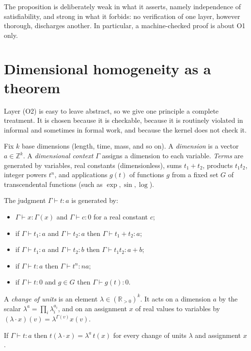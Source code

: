 The proposition is deliberately weak in what it asserts, namely independence of satisfiability, and strong in what it forbids: no verification of one layer, however thorough, discharges another. In particular, a machine-checked proof is about O1 only.

\section{Dimensional homogeneity as a theorem}
\label{sec:dimensions}

Layer (O2) is easy to leave abstract, so we give one principle a complete treatment. It is chosen because it is checkable, because it is routinely violated in informal and sometimes in formal work, and because the kernel does not check it.

Fix $k$ base dimensions (length, time, mass, and so on). A \emph{dimension} is a vector $a\in\mathbb{Z}^k$. A \emph{dimensional context} $\Gamma$ assigns a dimension to each variable. \emph{Terms} are generated by variables, real constants (dimensionless), sums $t_1+t_2$, products $t_1t_2$, integer powers $t^n$, and applications $g(t)$ of functions $g$ from a fixed set $G$ of transcendental functions (such as $\exp,\sin,\log$).

\begin{definition}
\label{def:dim-typing}
The judgment $\Gamma\vdash t:a$ is generated by:
\begin{itemize}[nosep]
\item $\Gamma\vdash x:\Gamma(x)$ and $\Gamma\vdash c:0$ for a real constant $c$;
\item if $\Gamma\vdash t_1:a$ and $\Gamma\vdash t_2:a$ then $\Gamma\vdash t_1+t_2:a$;
\item if $\Gamma\vdash t_1:a$ and $\Gamma\vdash t_2:b$ then $\Gamma\vdash t_1t_2:a+b$;
\item if $\Gamma\vdash t:a$ then $\Gamma\vdash t^n:na$;
\item if $\Gamma\vdash t:0$ and $g\in G$ then $\Gamma\vdash g(t):0$.
\end{itemize}
\end{definition}

A \emph{change of units} is an element $\lambda\in(\mathbb{R}_{>0})^k$. It acts on a dimension $a$ by the scalar $\lambda^a=\prod_i\lambda_i^{a_i}$, and on an assignment $x$ of real values to variables by $(\lambda\cdot x)(v)=\lambda^{\Gamma(v)}x(v)$.

\begin{theorem}
\label{thm:homogeneity}
If $\Gamma\vdash t:a$ then $t(\lambda\cdot x)=\lambda^{a}\,t(x)$ for every change of units $\lambda$ and assignment $x$.
\end{theorem}

